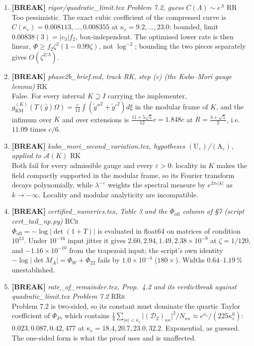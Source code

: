 \documentclass[11pt]{article}
\begin{document}
\begin{enumerate}[leftmargin=1.6em,itemsep=6pt]
\item \textbf{[BREAK]} \emph{rigor/quadratic\_limit.tex Problem 7.2, guess \(C(\Lambda)\sim e^{\Lambda}\)} \hfill\textsc{RR}\\ Too pessimistic. The exact cubic coefficient of the compressed curve is \(C(\kappa_c)=0.008113,\dots,0.008355\) at \(\kappa_c=9.2,\dots,23.0\): bounded, limit \(0.00838(3)=|c_3|f_2\), box-independent. The optimised lower rate is then linear, \(\Phi\ge f_2\zeta^2(1-0.99\zeta)\), not \(\log^{-2}\); bounding the two pieces separately gives \(O(\zeta^{2/3})\).
\item \textbf{[BREAK]} \emph{phase2b\_brief.md, track RK, step (c) (the Kubo--Mori gauge lemma)} \hfill\textsc{RK}\\ False. For every interval $K\supseteq I$ carrying the implementer, $g_{\mathrm{KM}}^{(K)}(T(\hat g)\Omega)=\frac{c}{12}\int(\tilde g''^2+\tilde g'^2)d\xi$ in the modular frame of $K$, and the infimum over $K$ and over extensions is $\frac{11+5\sqrt5}{12}c=1.848c$ at $R=\frac{3+\sqrt5}{2}$, i.e.\ $11.09$ times $c/6$.
\item \textbf{[BREAK]} \emph{kubo\_mori\_second\_variation.tex, hypotheses $(\mathrm U_\varepsilon)$/$(\mathrm A_\varepsilon)$, applied to $\mathcal A(K)$} \hfill\textsc{RK}\\ Both fail for every admissible gauge and every $\varepsilon>0$: locality in $K$ makes the field compactly supported in the modular frame, so its Fourier transform decays polynomially, while $\lambda^{-\varepsilon}$ weights the spectral measure by $e^{2\pi\varepsilon\lvert k\rvert}$ as $k\to-\infty$. Locality and modular analyticity are incompatible.
\item \textbf{[BREAK]} \emph{certified\_numerics.tex, Table 3 and the $\Phi_{\mathrm{off}}$ column of \S7 (script cert\_tail\_np.py)} \hfill\textsc{RCr}\\ $\Phi_{\mathrm{off}}=-\log\lvert\det(1+T)\rvert$ is evaluated in float64 on matrices of condition $10^{13}$. Under $10^{-16}$ input jitter it gives $2.60,2.94,1.49,2.38\times10^{-9}$ at $\zeta=1/120$, and $-1.16\times10^{-10}$ from the trapezoid input; the script's own identity $-\log\lvert\det M_A\rvert=\Phi_W+\Phi_{22}$ fails by $1.0\times10^{-4}$ ($180\times$). Widths $0.64$--$1.19\,\%$ unestablished.
\item \textbf{[BREAK]} \emph{rate\_of\_remainder.tex, Prop.\ 4.2 and its verdictbreak against quadratic\_limit.tex Problem 7.2} \hfill\textsc{RRr}\\ Problem 7.2 is two-sided, so its constant must dominate the quartic Taylor coefficient of $\Phi_P$, which contains $\frac14\sum_{\lvert\kappa\rvert<\kappa_c}\lvert(\mathcal D_2)_{\kappa\kappa}\rvert^2/N_{\kappa\kappa}\approx e^{\kappa_c}/(225\kappa_c^6)$: $0.023,0.087,0.42,477$ at $\kappa_c=18.4,20.7,23.0,32.2$. Exponential, as guessed. The one-sided form is what the proof uses and is unaffected.

\end{enumerate}
\end{document}
